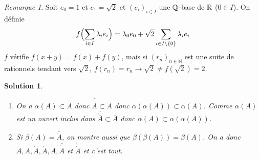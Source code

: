 \documentclass[12pt]{article}
\newtheorem{solution}{Solution}[section]
\theoremstyle{remark}
\newtheorem{remark}{Remarque}[section]
\newcommand{\N}{\mathbb{N}} \newcommand{\Z}{\mathbb{Z}}
\numberwithin{equation}{section}
\begin{document}
\begin{remark}
	Soit $e_{0}=1$ et $e_{1}=\sqrt{2}$ et $(e_{i})_{i\in I}$ une $\mathbb{Q}$-base de $\mathbb{R}$ ($0\in I$). On définie 
	$$f\Bigl(\sum_{i\in I}\lambda_{i} e_{i}\Bigr)=\lambda_{0}e_{0}+\sqrt{2}\sum_{i\in I\setminus\{0\}}\lambda_{i}e_{i}$$
	$f$ vérifie $f(x+y)=f(x)+f(y)$, mais si $(r_{n})_{n\in\N}$ est une suite de rationnels tendant vers $\sqrt{2}$, $f(r_{n})=r_{n}\to\sqrt{2}\neq f(\sqrt{2})=2$.
\end{remark}

\begin{solution}
	\phantom{}
	\begin{enumerate}
		\item On a $\alpha(A)\subset \overline{A}$ donc $\overline{\mathring{\overline{A}}}\subset\overline{A}$ donc $\alpha(\alpha(A))\subset\alpha(A)$. Comme $\alpha(A)$ est un ouvert inclus dans $\overline{\mathring{\overline{A}}}\subset\overline{A}$ donc $\alpha(A)\subset\alpha(\alpha(A))$.

		\item Si $\beta(A)=\overline{\mathring{A}}$, on montre aussi que $\beta(\beta(A))=\beta(A)$. On a donc $A,\overline{A},\mathring{A},\overline{\mathring{A}},\mathring{\overline{A}},\overline{\mathring{\overline{A}}}$ et $\mathring{\overline{\mathring{A}}}$ et c'est tout.
	\end{enumerate}
\end{solution}
\end{document}
